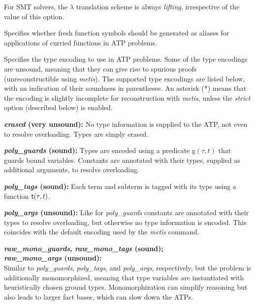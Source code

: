 \documentclass[a4paper,12pt]{article}
\newcommand\const[1]{\textsf{#1}}
\begin{document}
\begin{enum}
For SMT solvers, the $\lambda$ translation scheme is always \textit{lifting},
irrespective of the value of this option.

Specifies whether fresh function symbols should be generated as aliases for
applications of curried functions in ATP problems.

Specifies the type encoding to use in ATP problems. Some of the type encodings
are unsound, meaning that they can give rise to spurious proofs
(unreconstructible using \textit{metis}). The supported type encodings are
listed below, with an indication of their soundness in parentheses.
An asterisk (*) means that the encoding is slightly incomplete for
reconstruction with \textit{metis}, unless the \emph{strict} option (described
below) is enabled.

\begin{enum}
\item[\labelitemi] \textbf{\textit{erased} (very unsound):} No type information is
supplied to the ATP, not even to resolve overloading. Types are simply erased.

\item[\labelitemi] \textbf{\textit{poly\_guards} (sound):} Types are encoded using
a predicate \const{g}$(\tau, t)$ that guards bound
variables. Constants are annotated with their types, supplied as additional
arguments, to resolve overloading.

\item[\labelitemi] \textbf{\textit{poly\_tags} (sound):} Each term and subterm is
tagged with its type using a function $\const{t\/}(\tau, t)$.

\item[\labelitemi] \textbf{\textit{poly\_args} (unsound):}
Like for \textit{poly\_guards} constants are annotated with their types to
resolve overloading, but otherwise no type information is encoded. This
coincides with the default encoding used by the \textit{metis} command.

\item[\labelitemi]
\textbf{%
\textit{raw\_mono\_guards}, \textit{raw\_mono\_tags} (sound); \\
\textit{raw\_mono\_args} (unsound):} \\
Similar to \textit{poly\_guards}, \textit{poly\_tags}, and \textit{poly\_args},
respectively, but the problem is additionally monomorphized, meaning that type
variables are instantiated with heuristically chosen ground types.
Monomorphization can simplify reasoning but also leads to larger fact bases,
which can slow down the ATPs.


\end{enum}
\end{enum}
\end{document}
